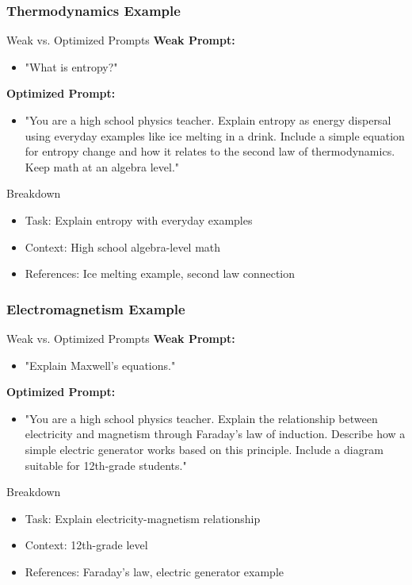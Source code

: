\documentclass{beamer}
\begin{document}
\begin{frame}
\frametitle{Thermodynamics Example}
\begin{block}{Weak vs. Optimized Prompts}
\textbf{Weak Prompt:}
\begin{itemize}
\item "What is entropy?"
\end{itemize}

\textbf{Optimized Prompt:}
\begin{itemize}
\item "You are a high school physics teacher. Explain entropy as energy dispersal using everyday examples like ice melting in a drink. Include a simple equation for entropy change and how it relates to the second law of thermodynamics. Keep math at an algebra level."
\end{itemize}
\end{block}

\begin{alertblock}{Breakdown}
\begin{itemize}
\item Task: Explain entropy with everyday examples
\item Context: High school algebra-level math
\item References: Ice melting example, second law connection
\end{itemize}
\end{alertblock}
\end{frame}

\begin{frame}
\frametitle{Electromagnetism Example}
\begin{block}{Weak vs. Optimized Prompts}
\textbf{Weak Prompt:}
\begin{itemize}
\item "Explain Maxwell's equations."
\end{itemize}

\textbf{Optimized Prompt:}
\begin{itemize}
\item "You are a high school physics teacher. Explain the relationship between electricity and magnetism through Faraday's law of induction. Describe how a simple electric generator works based on this principle. Include a diagram suitable for 12th-grade students."
\end{itemize}
\end{block}

\begin{alertblock}{Breakdown}
\begin{itemize}
\item Task: Explain electricity-magnetism relationship
\item Context: 12th-grade level
\item References: Faraday's law, electric generator example
\end{itemize}
\end{alertblock}
\end{frame}
\end{document}
